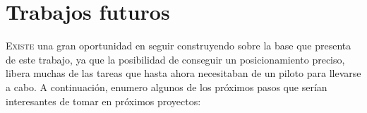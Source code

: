 




\chapter{Trabajos futuros}

\lettrine[lraise=-0.1, lines=2, loversize=0.2]{E}{xiste} una gran oportunidad en seguir construyendo sobre la base que presenta de este trabajo, ya que la posibilidad de conseguir un posicionamiento preciso, libera muchas de las tareas que hasta ahora necesitaban de un piloto para llevarse a cabo. A continuación, enumero algunos de los próximos pasos que serían interesantes de tomar en próximos proyectos: 

